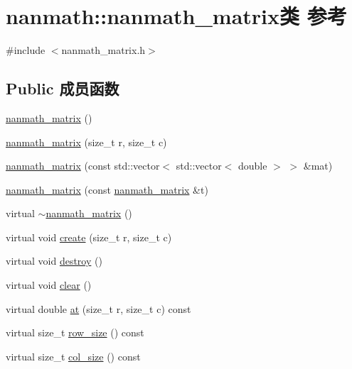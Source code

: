 \hypertarget{classnanmath_1_1nanmath__matrix}{}\section{nanmath\+:\+:nanmath\+\_\+matrix类 参考}
\label{classnanmath_1_1nanmath__matrix}


{\ttfamily \#include $<$nanmath\+\_\+matrix.\+h$>$}

\subsection*{Public 成员函数}
\begin{DoxyCompactItemize}
\item 
\hyperlink{classnanmath_1_1nanmath__matrix_a4f0a09745fd4a7563a9462358a4cf9f3}{nanmath\+\_\+matrix} ()
\item 
\hyperlink{classnanmath_1_1nanmath__matrix_a16873cc6b8741de29e1d7a596ee8836c}{nanmath\+\_\+matrix} (size\+\_\+t r, size\+\_\+t c)
\item 
\hyperlink{classnanmath_1_1nanmath__matrix_ad2712c998744cec123026fe3cbb7b5da}{nanmath\+\_\+matrix} (const std\+::vector$<$ std\+::vector$<$ double $>$ $>$ \&mat)
\item 
\hyperlink{classnanmath_1_1nanmath__matrix_aa0a5698fe01db8ee25bd9d8fbe646628}{nanmath\+\_\+matrix} (const \hyperlink{classnanmath_1_1nanmath__matrix}{nanmath\+\_\+matrix} \&t)
\item 
virtual \hyperlink{classnanmath_1_1nanmath__matrix_a41cc1dac91f6ef08f9b3ec1baf1af3e3}{$\sim$nanmath\+\_\+matrix} ()
\item 
virtual void \hyperlink{classnanmath_1_1nanmath__matrix_a0d9762b03f6e27563bbdf821be78342d}{create} (size\+\_\+t r, size\+\_\+t c)
\item 
virtual void \hyperlink{classnanmath_1_1nanmath__matrix_a8a1432e6ebd91c5035285ee47c747798}{destroy} ()
\item 
virtual void \hyperlink{classnanmath_1_1nanmath__matrix_a65c42ef1d4dca4553ffd13fcc0258a74}{clear} ()
\item 
virtual double \hyperlink{classnanmath_1_1nanmath__matrix_abeecd392efba8d91e4f0e1151199d063}{at} (size\+\_\+t r, size\+\_\+t c) const 
\item 
virtual size\+\_\+t \hyperlink{classnanmath_1_1nanmath__matrix_a15dc80fe330112c1a17ef6f7de168943}{row\+\_\+size} () const 
\item 
virtual size\+\_\+t \hyperlink{classnanmath_1_1nanmath__matrix_a4fcc48d81fc393f7cbee5e3c1fe04f75}{col\+\_\+size} () const 

\end{DoxyCompactItemize}
